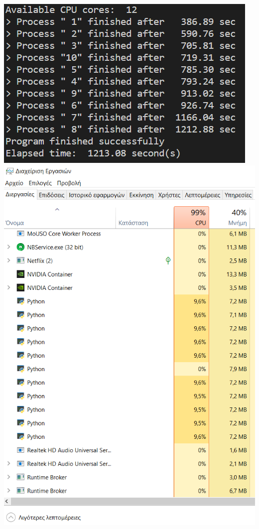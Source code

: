 \documentclass[12pt]{article}
\begin{document}
\begin{center}
\includegraphics[scale=1]{ex6_results}
\includegraphics[scale=0.4]{ex6_stats_front}


\end{center}
\end{document}
